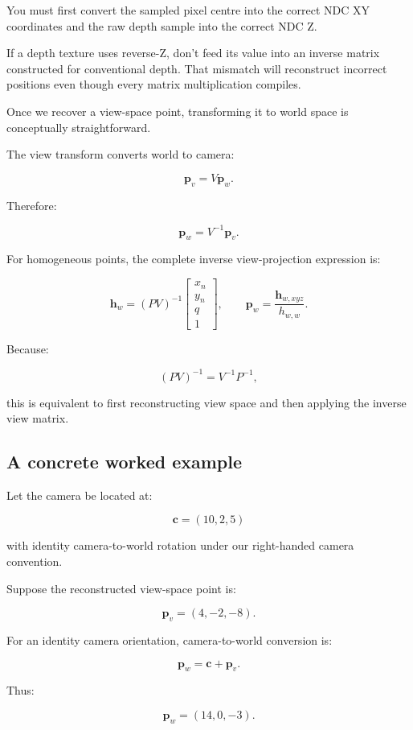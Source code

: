 You must first convert the sampled pixel centre into the correct NDC XY coordinates and the raw depth sample into the correct NDC Z.

If a depth texture uses reverse-Z, don't feed its value into an inverse matrix constructed for conventional depth. That mismatch will reconstruct incorrect positions even though every matrix multiplication compiles.

Once we recover a view-space point, transforming it to world space is conceptually straightforward.

The view transform converts world to camera:

\[ \mathbf p_v=V\mathbf p_w. \]

Therefore:

\[ \boxed{ \mathbf p_w=V^{-1}\mathbf p_v. } \]

For homogeneous points, the complete inverse view-projection expression is:

\[ \boxed{ \mathbf h_w=(PV)^{-1} \begin{bmatrix} x_n\\y_n\\q\\1 \end{bmatrix}, \qquad \mathbf p_w=\frac{\mathbf h_{w,xyz}}{h_{w,w}}. } \]

Because:

\[ (PV)^{-1}=V^{-1}P^{-1}, \]

this is equivalent to first reconstructing view space and then applying the inverse view matrix.

\subsection{A concrete worked example}\label{02-foundations-ii-ch035-a-concrete-worked-example}

Let the camera be located at:

\[ \mathbf c=(10,2,5) \]

with identity camera-to-world rotation under our right-handed camera convention.

Suppose the reconstructed view-space point is:

\[ \mathbf p_v=(4,-2,-8). \]

For an identity camera orientation, camera-to-world conversion is:

\[ \mathbf p_w=\mathbf c+\mathbf p_v. \]

Thus:

\[ \boxed{ \mathbf p_w=(14,0,-3). } \]

